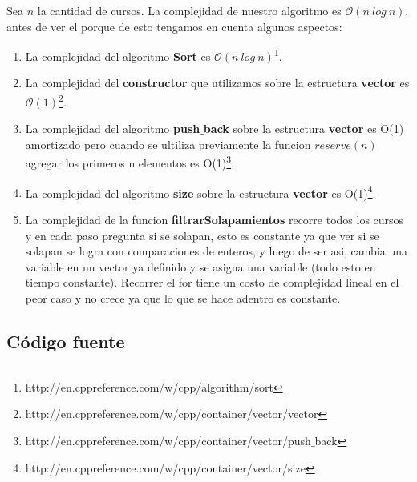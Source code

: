 Sea $n$ la cantidad de cursos. La complejidad de nuestro algoritmo es $\mathcal{O}(n\ log\ n)$, antes de ver el porque de esto tengamos en cuenta algunos aspectos:
\begin{enumerate}
\item La complejidad del algoritmo \textbf{Sort} es $\mathcal{O}(n\ log\ n)$\footnote{http://en.cppreference.com/w/cpp/algorithm/sort}.
\item La complejidad del \textbf{constructor} que utilizamos sobre la estructura \textbf{vector} es $\mathcal{O}(1)$\footnote{http://en.cppreference.com/w/cpp/container/vector/vector}.
\item La complejidad del algoritmo \textbf{push$\_$back} sobre la estructura \textbf{vector} es O(1) amortizado pero cuando se ultiliza previamente la funcion $reserve(n)$ agregar los primeros n elementos es O(1)\footnote{http://en.cppreference.com/w/cpp/container/vector/push$\_$back}. 
\item La complejidad del algoritmo \textbf{size} sobre la estructura \textbf{vector} es O(1)\footnote{http://en.cppreference.com/w/cpp/container/vector/size}.
\item La complejidad de la funcion \textbf{filtrarSolapamientos} recorre todos los cursos y en cada paso pregunta si se solapan, esto es constante ya que ver si se solapan se logra con comparaciones de enteros, y luego de ser asi, cambia una variable en un vector ya definido y se asigna una variable (todo esto en tiempo constante). Recorrer el for tiene un costo de complejidad lineal en el peor caso y no crece ya que lo que se hace adentro es constante.
\end{enumerate}






\subsection{Código fuente}




